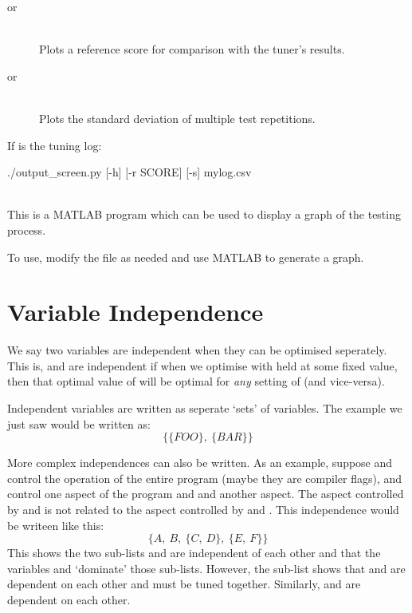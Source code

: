 \documentclass[a4paper, draft]{article}
\begin{document}
\begin{description}
\begin{description}
            \item[ \textnormal{or} ] \hfill\\
                Plots a reference score for comparison with the tuner's results.
            
            \item[ \textnormal{or} ] \hfill\\
                Plots the standard deviation of multiple test repetitions.
            
        \end{description}
        
        If  is the tuning log:
        \begin{Code}[numbers=none]
./output_screen.py [-h] [-r SCORE] [-s] mylog.csv
        \end{Code}


    \item[\filename{utilities/csv\_plot.m}] \hfill \\
        This is a MATLAB program which can be used to display a graph of the 
        testing process.
        
        To use, modify the file as needed and use MATLAB to generate a graph.


\end{description}





\clearpage

\section{Variable Independence}
\label{sec:var-indep}
We say two variables are independent when they can be optimised seperately. 
This is,  and  are independent if when we optimise 
 with  held at some fixed value, then that optimal 
value of  will be optimal for \emph{any} setting of  
(and vice-versa). 

Independent variables are written as seperate `sets' of 
variables. The example we just saw would be written as:
\[\{\{FOO\},~\{BAR\}\}\]

More complex independences can also be written. As an example, suppose 
 and  control the operation of the entire program (maybe 
they are compiler flags),  and  control one aspect of the 
program and  and  another aspect. The aspect controlled 
by  and  is not related to the aspect controlled by 
 and . This independence would be writeen like this: 
\[\{A,~B,~\{C,~D\},~\{E,~F\}\}\]
This shows the two sub-lists  and  are 
independent of each other and that the variables  and  
`dominate' those sub-lists. However, the sub-list  shows that 
 and  are dependent on each other and must be tuned together. 
Similarly,  and  are dependent on each other.
\end{document}
